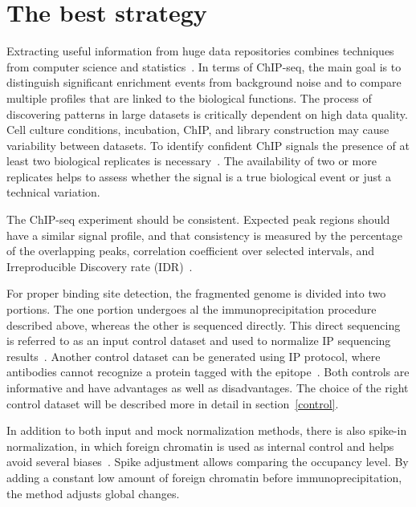\section{The best strategy}
\label{strategy}

Extracting useful information from huge data repositories combines techniques from computer science and statistics~\cite{friedman2001elements}. 
In terms of ChIP-seq, the main goal is to distinguish significant enrichment events from background noise and to compare multiple profiles that are linked to the biological functions. 
The process of discovering patterns in large datasets is critically dependent on high data quality. 
Cell culture conditions, incubation, ChIP, and library construction may cause variability between datasets. 
To identify confident ChIP signals the presence of at least two biological replicates is necessary~\cite{kidder2011chip}. 
The availability of two or more replicates helps to assess whether the signal is a true biological event or just a technical variation. 

The ChIP-seq experiment should be consistent. 
Expected peak regions should have a similar signal profile, and that consistency is measured by the percentage of the overlapping peaks, correlation coefficient over selected intervals, and Irreproducible Discovery rate (IDR)~\cite{shin2013computational}.

For proper binding site detection, the fragmented genome is divided into two portions. 
The one portion undergoes al the immunoprecipitation procedure described above, whereas the other is sequenced directly. 
This direct sequencing is referred to as an input control dataset and used to normalize IP sequencing results~\cite{kidder2011chip}. 
Another control dataset can be generated using IP protocol, where antibodies cannot recognize a protein tagged with the epitope~\cite{flensburg2014comparison}. 
Both controls are informative and have advantages as well as disadvantages.
The choice of the right control dataset will be described more in detail in section~\ref{control}.

In addition to both input and mock normalization methods, there is also spike-in normalization, in which foreign chromatin is used as internal control and helps avoid several biases~\cite{bonhoure2014quantifying}.
Spike adjustment allows comparing the occupancy level. 
By adding a constant low amount of foreign chromatin before immunoprecipitation, the method adjusts global changes. 